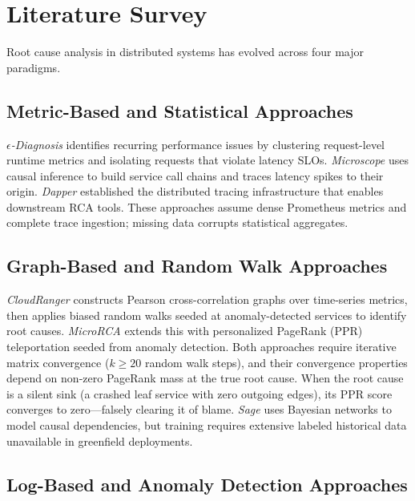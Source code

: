 \documentclass[conference]{IEEEtran}
\begin{document}
\section{Literature Survey}

Root cause analysis in distributed systems has evolved across four major paradigms.

\subsection{Metric-Based and Statistical Approaches}

\textit{$\epsilon$-Diagnosis} \cite{shan2019} identifies recurring performance issues by clustering request-level runtime metrics and isolating requests that violate latency SLOs. \textit{Microscope} \cite{lin2018} uses causal inference to build service call chains and traces latency spikes to their origin. \textit{Dapper} \cite{sigelman2010} established the distributed tracing infrastructure that enables downstream RCA tools. These approaches assume dense Prometheus metrics and complete trace ingestion; missing data corrupts statistical aggregates.

\subsection{Graph-Based and Random Walk Approaches}

\textit{CloudRanger} \cite{wang2018} constructs Pearson cross-correlation graphs over time-series metrics, then applies biased random walks seeded at anomaly-detected services to identify root causes. \textit{MicroRCA} \cite{wu2020} extends this with personalized PageRank (PPR) teleportation seeded from anomaly detection. Both approaches require iterative matrix convergence ($k \geq 20$ random walk steps), and their convergence properties depend on non-zero PageRank mass at the true root cause. When the root cause is a silent sink (a crashed leaf service with zero outgoing edges), its PPR score converges to zero---falsely clearing it of blame. \textit{Sage} \cite{bhagwan2020} uses Bayesian networks to model causal dependencies, but training requires extensive labeled historical data unavailable in greenfield deployments.

\subsection{Log-Based and Anomaly Detection Approaches}
\end{document}
